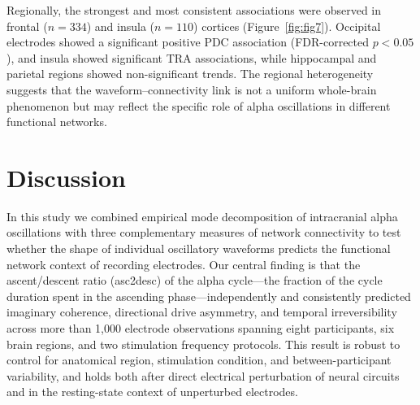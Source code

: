 \documentclass[11pt, a4paper]{article}
\newcommand{\asc}{asc2desc}
\begin{document}
Regionally, the strongest and most consistent associations were observed in
frontal ($n = 334$) and insula ($n = 110$) cortices (Figure~\ref{fig:fig7}).
Occipital electrodes showed a significant positive PDC association
(FDR-corrected $p < 0.05$), and insula showed significant TRA associations,
while hippocampal and parietal regions showed non-significant trends. The
regional heterogeneity suggests that the waveform--connectivity link is not a
uniform whole-brain phenomenon but may reflect the specific role of alpha
oscillations in different functional networks.

\section{Discussion}

In this study we combined empirical mode decomposition of intracranial alpha
oscillations with three complementary measures of network connectivity to test
whether the shape of individual oscillatory waveforms predicts the functional
network context of recording electrodes. Our central finding is that the
ascent/descent ratio (\asc) of the alpha cycle---the fraction of the cycle
duration spent in the ascending phase---independently and consistently predicted
imaginary coherence, directional drive asymmetry, and temporal irreversibility
across more than 1,000 electrode observations spanning eight participants, six
brain regions, and two stimulation frequency protocols. This result is robust to
control for anatomical region, stimulation condition, and between-participant
variability, and holds both after direct electrical perturbation of neural
circuits and in the resting-state context of unperturbed electrodes.
\end{document}
